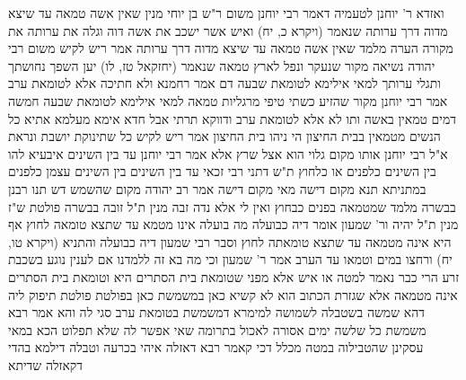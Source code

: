 \documentclass[12pt, openany]{book}
\begin{document}
{ואזדא ר' יוחנן לטעמיה דאמר רבי יוחנן משום ר"ש בן יוחי מנין שאין אשה טמאה עד שיצא מדוה דרך ערותה שנאמר (ויקרא כ, יח) ואיש אשר ישכב את אשה דוה וגלה את ערותה את מקורה הערה מלמד שאין אשה טמאה עד שיצא מדוה דרך ערותה 
אמר ריש לקיש משום רבי יהודה נשיאה מקור שנעקר ונפל לארץ טמאה שנאמר (יחזקאל טז, לו) יען השפך נחושתך ותגלי ערותך 
למאי אילימא לטומאת שבעה דם אמר רחמנא ולא חתיכה אלא לטומאת ערב
אמר רבי יוחנן מקור שהזיע כשתי טיפי מרגליות טמאה למאי אילימא לטומאת שבעה חמשה דמים טמאין באשה ותו לא אלא לטומאת ערב ודווקא תרתי אבל חדא אימא מעלמא אתיא
כל הנשים מטמאין בבית החיצון הי ניהו בית החיצון אמר ריש לקיש כל שתינוקת יושבת ונראת 
א"ל רבי יוחנן אותו מקום גלוי הוא אצל שרץ אלא אמר רבי יוחנן עד בין השינים 
איבעיא להו בין השינים כלפנים או כלחוץ ת"ש דתני רבי זכאי עד בין השינים בין השינים עצמן כלפנים 
במתניתא תנא מקום דישה מאי מקום דישה אמר רב יהודה מקום שהשמש דש 
תנו רבנן בבשרה מלמד שמטמאה בפנים כבחוץ ואין לי אלא נדה זבה מנין ת"ל זובה בבשרה 
פולטת ש"ז מנין ת"ל יהיה ור' שמעון אומר דיה כבועלה מה בועלה אינו מטמא עד שתצא טומאה לחוץ אף היא אינה מטמאה עד שתצא טומאתה לחוץ 
וסבר רבי שמעון דיה כבועלה והתניא (ויקרא טו, יח) ורחצו במים וטמאו עד הערב אמר ר' שמעון וכי מה בא זה ללמדנו אם לענין נוגע בשכבת זרע הרי כבר נאמר למטה או איש
אלא מפני שטומאת בית הסתרים היא וטומאת בית הסתרים אינה מטמאה אלא שגזרת הכתוב הוא 
לא קשיא כאן במשמשת כאן בפולטת 
פולטת תיפוק ליה דהא שמשה בשטבלה לשמושה 
למימרא דמשמשת בטומאת ערב סגי לה והא אמר רבא משמשת כל שלשה ימים אסורה לאכול בתרומה שאי אפשר לה שלא תפלוט 
הכא במאי עסקינן שהטבילוה במטה מכלל דכי קאמר רבא דאזלה איהי בכרעה וטבלה דילמא בהדי דקאזלה שדיתא}
\end{document}
